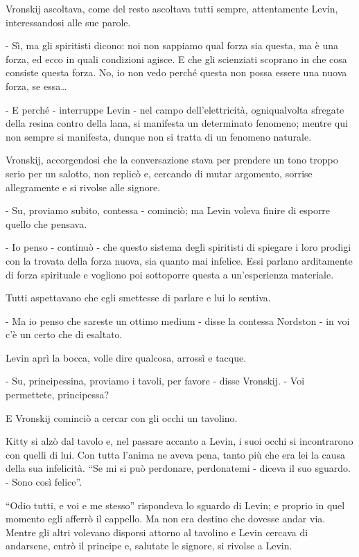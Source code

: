 Vronskij ascoltava, come del resto ascoltava tutti sempre, attentamente Levin, interessandosi alle sue parole. 

- Sì, ma gli spiritisti dicono: noi non sappiamo qual forza sia questa, ma è una forza, ed ecco in quali condizioni agisce. E che gli scienziati scoprano in che cosa consiste questa forza. No, io non vedo perché questa non possa essere una nuova forza, se essa\ldots{} 

- E perché - interruppe Levin - nel campo dell'elettricità, ogniqualvolta sfregate della resina contro della lana, si manifesta un determinato fenomeno; mentre qui non sempre si manifesta, dunque non si tratta di un fenomeno naturale. 

Vronskij, accorgendosi che la conversazione stava per prendere un tono troppo serio per un salotto, non replicò e, cercando di mutar argomento, sorrise allegramente e si rivolse alle signore. 

- Su, proviamo subito, contessa - cominciò; ma Levin voleva finire di esporre quello che pensava. 

- Io penso - continuò - che questo sistema degli spiritisti di spiegare i loro prodigi con la trovata della forza nuova, sia quanto mai infelice. Essi parlano arditamente di forza spirituale e vogliono poi sottoporre questa a un'esperienza materiale. 

Tutti aspettavano che egli smettesse di parlare e lui lo sentiva. 

- Ma io penso che sareste un ottimo medium - disse la contessa Nordston - in voi c'è un certo che di esaltato. 

Levin aprì la bocca, volle dire qualcosa, arrossì e tacque. 

- Su, principessina, proviamo i tavoli, per favore - disse Vronskij. - Voi permettete, principessa? 

E Vronskij cominciò a cercar con gli occhi un tavolino. 

Kitty si alzò dal tavolo e, nel passare accanto a Levin, i suoi occhi si incontrarono con quelli di lui. Con tutta l'anima ne aveva pena, tanto più che era lei la causa della sua infelicità. ``Se mi si può perdonare, perdonatemi - diceva il suo sguardo. - Sono così felice''. 

``Odio tutti, e voi e me stesso'' rispondeva lo sguardo di Levin; e proprio in quel momento egli afferrò il cappello. Ma non era destino che dovesse andar via. Mentre gli altri volevano disporsi attorno al tavolino e Levin cercava di andarsene, entrò il principe e, salutate le signore, si rivolse a Levin. 

